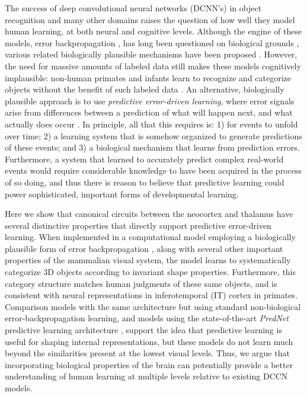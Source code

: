 \documentclass[12pt,twoside]{nature}
\newif\myifpdf
\begin{document}
The success of deep convolutional neural networks (DCNN's) \cite{KrizhevskySutskeverHinton12,LeCunBengioHinton15,Schmidhuber15a} in object recognition and many other domains raises the question of how well they model human learning, at both neural and cognitive levels.  Although the engine of these models, error backpropagation \cite{RumelhartHintonWilliams86}, has long been questioned on biological grounds \cite{Crick89}, various related biologically plausible mechanisms have been proposed \cite{OReilly96,XieSeung03,BengioMesnardFischerEtAl17}.  However, the need for massive amounts of labeled data still makes these models cognitively implausible: non-human primates and infants learn to recognize and categorize objects without the benefit of such labeled data \cite{LakeUllmanTenenbaumEtAl17}.  An alternative, biologically plausible approach is to use {\em predictive error-driven learning}, where error signals arise from differences between a prediction of what will happen next, and what actually does occur \cite{Elman90,ElmanBatesKarmiloff-SmithEtAl96}.  In principle, all that this requires is: 1) for events to unfold over time; 2) a learning system that is somehow organized to generate predictions of these events; and 3) a biological mechanism that learns from prediction errors. Furthermore, a system that learned to accurately predict complex real-world events would require considerable knowledge to have been acquired in the process of so doing, and thus there is reason to believe that predictive learning could power sophisticated, important forms of developmental learning.

Here we show that canonical circuits between the neocortex and thalamus have several distinctive properties that directly support predictive error-driven learning.  When implemented in a computational model employing a biologically plausible form of error backpropagation \cite{OReilly96,OReillyMunakata00,OReillyMunakataFrankEtAl12}, along with several other important properties of the mammalian visual system, the model learns to systematically categorize 3D objects according to invariant shape properties.  Furthermore, this category structure matches human judgments of these same objects, and is consistent with neural representations in inferotemporal (IT) cortex in primates.  Comparison models with the same architecture but using standard non-biological error-backpropagation learning, and models using the state-of-the-art {\em PredNet} predictive learning architecture \cite{LotterKreimanCox16}, support the idea that predictive learning is useful for shaping internal representations, but these models do not learn much beyond the similarities present at the lowest visual levels.  Thus, we argue that incorporating biological properties of the brain can potentially provide a better understanding of human learning at multiple levels relative to existing DCCN models.
\end{document}
